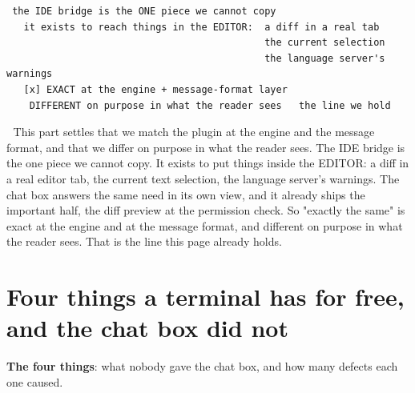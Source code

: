 \begin{verbatim}
 the IDE bridge is the ONE piece we cannot copy
   it exists to reach things in the EDITOR:  a diff in a real tab
                                             the current selection
                                             the language server's warnings
   [x] EXACT at the engine + message-format layer
    DIFFERENT on purpose in what the reader sees   the line we hold
\end{verbatim}
📌 This part settles that we match the plugin at the engine and the message format, and that we differ on purpose in what the reader sees. The IDE bridge is the one piece we cannot copy. It exists to put things inside the EDITOR: a diff in a real editor tab, the current text selection, the language server's warnings. The chat box answers the same need in its own view, and it already ships the important half, the diff preview at the permission check. So "exactly the same" is exact at the engine and at the message format, and different on purpose in what the reader sees. That is the line this page already holds.


\section{Four things a terminal has for free, and the chat box did not}
\textbf{The four things}: what nobody gave the chat box, and how many defects each one caused.


